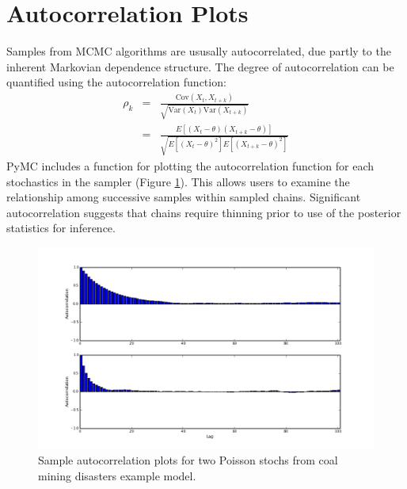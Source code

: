 
\hypertarget{autocorrelation}{}
\section*{Autocorrelation Plots} %

Samples from MCMC algorithms are ususally autocorrelated, due partly to the inherent Markovian dependence structure. The degree of autocorrelation can be quantified using the autocorrelation function:
\begin{eqnarray*}
    \rho_k &=& \frac{\mbox{Cov}(X_t, X_{t+k})}{\sqrt{\mbox{Var}(X_t)\mbox{Var}(X_{t+k})}} \\
            &=& \frac{E[(X_t - \theta)(X_{t+k} - \theta)]}{\sqrt{E[(X_t - \theta)^2] E[(X_{t+k} - \theta)^2]}}
\end{eqnarray*}
PyMC includes a function for plotting the autocorrelation function for each stochastics in the sampler (Figure \ref{fig:autocorr}). This allows users to examine the relationship among successive samples within sampled chains. Significant autocorrelation suggests that chains require thinning prior to use of the posterior statistics for inference.

\begin{figure}[h]
        \begin{center}
        \includegraphics[scale=0.4]{autocorr.png}
    \end{center}
    \caption{Sample autocorrelation plots for two Poisson stochs from coal mining disasters example model.}
    \label{fig:autocorr}
\end{figure}

